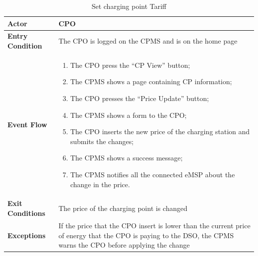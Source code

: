 \documentclass{Configuration_Files/PoliMi3i_thesis}
\begin{document}

\begin{table}[H]
    \begin{tabularx}{\textwidth}{| >{\columncolor{bluepoli!40}}l | X |}
    \hline
    \textbf{Actor} & CPO\T\B \\
    \hline
    \textbf{Entry Condition} & The CPO is logged on the CPMS and is on the home page\T\B\\
    \hline
    \textbf{Event Flow} & 
        \begin{enumerate}
        \item The CPO press the “CP View” button;
        \item The CPMS shows a page containing CP information;
        \item The CPO presses the “Price Update” button;
        \item The CPMS shows a form to the CPO;
        \item The CPO inserts the new price of the charging station and submits the changes;
        \item The CPMS shows a success message;
        \item The CPMS notifies all the connected eMSP about the change in the price.
        \end{enumerate}\B\\
    \hline
    \textbf{Exit Conditions} & The price of the charging point is changed\B\\
    \hline
    \textbf{Exceptions} & If the price that the CPO insert is lower than the current price of energy that the CPO is paying to the DSO, the CPMS warns the CPO before applying the change\B\\
    \hline
    \end{tabularx}
    \\[10pt]
    \caption{Set charging point Tariff}
    \label{table:example}
\end{table}

\end{document}
